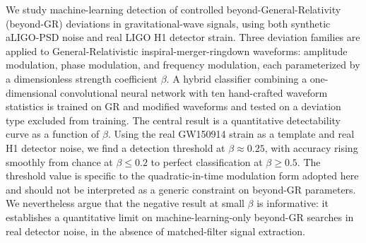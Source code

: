 We study machine-learning detection of controlled beyond-General-Relativity
(beyond-GR) deviations in gravitational-wave signals, using both synthetic
aLIGO-PSD noise and real LIGO H1 detector strain. Three deviation families
are applied to General-Relativistic inspiral-merger-ringdown waveforms:
amplitude modulation, phase modulation, and frequency modulation, each
parameterized by a dimensionless strength coefficient $\beta$. A hybrid
classifier combining a one-dimensional convolutional neural network with
ten hand-crafted waveform statistics is trained on GR and modified
waveforms and tested on a deviation type excluded from training. The
central result is a quantitative detectability curve as a function of
$\beta$. Using the real GW150914 strain as a template and real H1
detector noise, we find a detection threshold at $\beta \approx 0.25$,
with accuracy rising smoothly from chance at $\beta \leq 0.2$ to perfect
classification at $\beta \geq 0.5$. The threshold value is specific to
the quadratic-in-time modulation form adopted here and should not be
interpreted as a generic constraint on beyond-GR parameters. We
nevertheless argue that the negative result at small $\beta$ is
informative: it establishes a quantitative limit on machine-learning-only
beyond-GR searches in real detector noise, in the absence of matched-filter
signal extraction.
